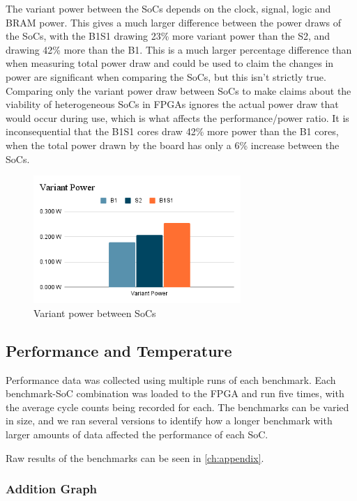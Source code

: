 The variant power between the SoCs depends on the clock, signal, logic and BRAM power. This gives a much larger difference between the power draws of the SoCs, with the B1S1 drawing 23\% more variant power than the S2, and drawing 42\% more than the B1. This is a much larger percentage difference than when measuring total power draw and could be used to claim the changes in power are significant when comparing the SoCs, but this isn't strictly true. Comparing only the variant power draw between SoCs to make claims about the viability of heterogeneous SoCs in FPGAs ignores the actual power draw that would occur during use, which is what affects the performance/power ratio. It is inconsequential that the B1S1 cores draw 42\% more power than the B1 cores, when the total power drawn by the board has only a 6\% increase between the SoCs.

\begin{figure}
    \centering
    \includegraphics[width=0.7\textwidth]{img/Variant Power.png}
    \caption{Variant power between SoCs}
    \label{fig:variant_power}
\end{figure}

\subsection{Performance and Temperature}
Performance data was collected using multiple runs of each benchmark. Each benchmark-SoC combination was loaded to the FPGA and run five times, with the average cycle counts being recorded for each. The benchmarks can be varied in size, and we ran several versions to identify how a longer benchmark with larger amounts of data affected the performance of each SoC.

Raw results of the benchmarks can be seen in \ref{ch:appendix}.

\subsubsection{Addition Graph}

